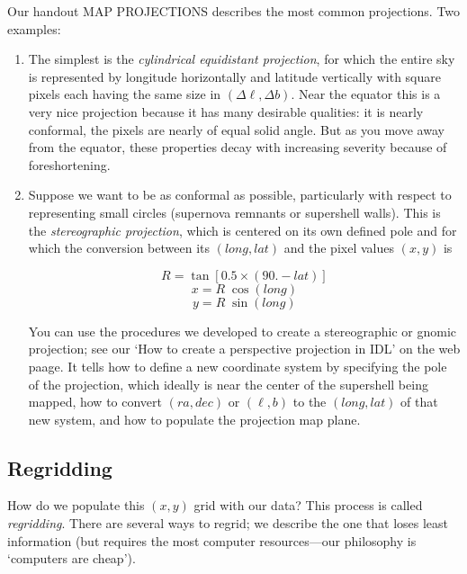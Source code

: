 \documentclass[psfig,preprint]{aastex}
\begin{document}
Our handout MAP PROJECTIONS describes the most common projections. Two
examples:
\begin{enumerate}

\item The simplest is the {\it cylindrical
equidistant projection}, for which the entire sky is represented by
longitude horizontally and latitude vertically with square pixels each
having the same size in $(\Delta \ell, \Delta b)$. Near the equator this
is a very nice projection because it has many desirable qualities: it
is nearly conformal, the pixels are nearly of equal solid angle. But as
you move away from the equator, these properties decay with increasing
severity because of foreshortening.

\item Suppose we want to be as conformal as possible, particularly with
  respect to representing small circles (supernova remnants or
  supershell walls). This is the {\it stereographic projection}, which
  is centered on its own defined pole and for which the conversion
  between its $(long, lat)$ and the pixel values $(x,y)$ is
%
\begin {mathletters}
\begin{equation}
   R = \tan[ 0.5 \times (90.-lat)] 
\end{equation}
\begin{equation}
   x= R \; \cos(long) 
\end{equation}
\begin{equation}
   y= R \; \sin(long) 
\end{equation}
\end {mathletters}
%
You can use the procedures we developed to create a stereographic or
gnomic projection; see our `How to create a perspective projection in
IDL' on the web paage. It tells how to define a
new coordinate system by specifying the pole of the projection, which ideally
is near the center of the supershell being mapped, how to convert
$(ra,dec)$ or $(\ell,b)$ to the $(long,lat)$ of that new system, and how
to populate the projection map plane.

\end{enumerate}

\subsection{Regridding}


How do we populate this $(x,y)$ grid
with our data? This process is called {\it regridding}. There are
several ways to regrid; we describe the one that loses least
information (but requires the most computer resources---our
philosophy is `computers are cheap').
\end{document}
